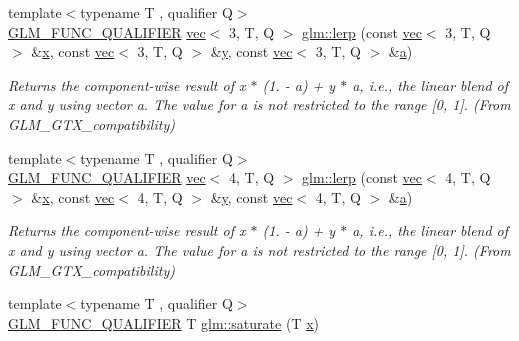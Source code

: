 \begin{DoxyCompactItemize}
{\footnotesize template$<$typename T , qualifier Q$>$ }\\\mbox{\hyperlink{setup_8hpp_a33fdea6f91c5f834105f7415e2a64407}{G\+L\+M\+\_\+\+F\+U\+N\+C\+\_\+\+Q\+U\+A\+L\+I\+F\+I\+ER}} \mbox{\hyperlink{structglm_1_1vec}{vec}}$<$ 3, T, Q $>$ \mbox{\hyperlink{group__gtx__compatibility_ga4ae1a616c8540a2649eab8e0cd051bb3}{glm\+::lerp}} (const \mbox{\hyperlink{structglm_1_1vec}{vec}}$<$ 3, T, Q $>$ \&\mbox{\hyperlink{_s_d_l__opengl_8h_ad0e63d0edcdbd3d79554076bf309fd47}{x}}, const \mbox{\hyperlink{structglm_1_1vec}{vec}}$<$ 3, T, Q $>$ \&\mbox{\hyperlink{_s_d_l__opengl_8h_a1675d9d7bb68e1657ff028643b4037e3}{y}}, const \mbox{\hyperlink{structglm_1_1vec}{vec}}$<$ 3, T, Q $>$ \&\mbox{\hyperlink{_s_d_l__opengl__glext_8h_a3309789fc188587d666cda5ece79cf82}{a}})
\begin{DoxyCompactList}\small\item\em Returns the component-\/wise result of x $\ast$ (1. -\/ a) + y $\ast$ a, i.\+e., the linear blend of x and y using vector a. The value for a is not restricted to the range \mbox{[}0, 1\mbox{]}. (From G\+L\+M\+\_\+\+G\+T\+X\+\_\+compatibility) \end{DoxyCompactList}\item 
{\footnotesize template$<$typename T , qualifier Q$>$ }\\\mbox{\hyperlink{setup_8hpp_a33fdea6f91c5f834105f7415e2a64407}{G\+L\+M\+\_\+\+F\+U\+N\+C\+\_\+\+Q\+U\+A\+L\+I\+F\+I\+ER}} \mbox{\hyperlink{structglm_1_1vec}{vec}}$<$ 4, T, Q $>$ \mbox{\hyperlink{group__gtx__compatibility_gab5477ab69c40de4db5d58d3359529724}{glm\+::lerp}} (const \mbox{\hyperlink{structglm_1_1vec}{vec}}$<$ 4, T, Q $>$ \&\mbox{\hyperlink{_s_d_l__opengl_8h_ad0e63d0edcdbd3d79554076bf309fd47}{x}}, const \mbox{\hyperlink{structglm_1_1vec}{vec}}$<$ 4, T, Q $>$ \&\mbox{\hyperlink{_s_d_l__opengl_8h_a1675d9d7bb68e1657ff028643b4037e3}{y}}, const \mbox{\hyperlink{structglm_1_1vec}{vec}}$<$ 4, T, Q $>$ \&\mbox{\hyperlink{_s_d_l__opengl__glext_8h_a3309789fc188587d666cda5ece79cf82}{a}})
\begin{DoxyCompactList}\small\item\em Returns the component-\/wise result of x $\ast$ (1. -\/ a) + y $\ast$ a, i.\+e., the linear blend of x and y using vector a. The value for a is not restricted to the range \mbox{[}0, 1\mbox{]}. (From G\+L\+M\+\_\+\+G\+T\+X\+\_\+compatibility) \end{DoxyCompactList}\item 
{\footnotesize template$<$typename T , qualifier Q$>$ }\\\mbox{\hyperlink{setup_8hpp_a33fdea6f91c5f834105f7415e2a64407}{G\+L\+M\+\_\+\+F\+U\+N\+C\+\_\+\+Q\+U\+A\+L\+I\+F\+I\+ER}} T \mbox{\hyperlink{group__gtx__compatibility_ga0fd09e616d122bc2ed9726682ffd44b7}{glm\+::saturate}} (T \mbox{\hyperlink{_s_d_l__opengl_8h_ad0e63d0edcdbd3d79554076bf309fd47}{x}})

\end{DoxyCompactItemize}
